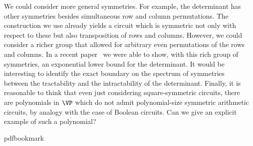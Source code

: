 \documentclass[11pt]{article}
\begin{document}
We could consider more general symmetries. For example, the determinant has
other symmetries besides simultaneous row and column permutations. The
construction we use already yields a circuit which is symmetric not only with
respect to these but also transposition of rows and columns.  However, we could
consider a richer group that allowed for arbitrary even permutations of the rows
and columns.  %
In a recent paper~\cite{DWitcs22}  %
we %
were %
able to show, with this rich
group of symmetries, an exponential lower bound for the determinant.  It would be interesting to identify the exact boundary on the spectrum of symmetries between the tractability and the intractability of the determinant.
Finally, it is reasonable to think that even just considering
square-symmetric %
circuits, there are polynomials in $\VP$ which do
not admit polynomial-size symmetric arithmetic circuits, by analogy with the
case of Boolean circuits.  Can we give an explicit example of such a polynomial?

\newcommand{\prelim}{Preliminary version in\ }\newcommand{\prelims}{Preliminary
  versions in\ }
\providecommand{\bibhead}[1]{}
\expandafter\ifx\csname pdfbookmark\endcsname\relax%
  \providecommand{\tocrefpdfbookmark}{}
\else\providecommand{\tocrefpdfbookmark}{%
   \hypertarget{tocreferences}{}%
   \pdfbookmark[1]{References}{tocreferences}}%
\fi
\end{document}
